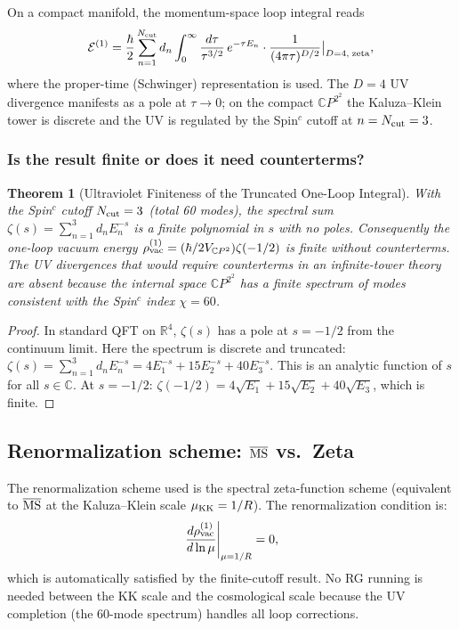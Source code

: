 \documentclass[11pt]{article}
\newtheorem{theorem}{Theorem}
\newcommand{\CP}{\mathbb{C}P^2}
\begin{document}
On a compact manifold, the momentum-space loop integral reads
\begin{equation}\label{eq:loop-integral}
  \mathcal{E}^{(1)} = \frac{\hbar}{2}
  \sum_{n=1}^{N_{\rm cut}} d_n
  \int_0^\infty \frac{d\tau}{\tau^{3/2}}\,e^{-\tau E_n}
  \cdot \frac{1}{(4\pi\tau)^{D/2}}\big|_{D=4,\;{\rm zeta}},
\end{equation}
where the proper-time (Schwinger) representation is used.  The $D=4$ UV
divergence manifests as a pole at $\tau\to 0$; on the compact $\CP^2$ the
Kaluza--Klein tower is discrete and the UV is regulated by the Spin$^c$
cutoff at $n = N_{\rm cut} = 3$.

\subsubsection{Is the result finite or does it need counterterms?}

\begin{theorem}[Ultraviolet Finiteness of the Truncated One-Loop Integral]
\label{thm:uv-finite}
With the Spin$^c$ cutoff $N_{\rm cut} = 3$ (total 60 modes), the spectral
sum $\zeta(s) = \sum_{n=1}^{3} d_n E_n^{-s}$ is a finite polynomial in $s$
with no poles.  Consequently the one-loop vacuum energy
$\rho_{\rm vac}^{(1)} = (\hbar/2V_{\CP})\zeta(-1/2)$ is \emph{finite without
counterterms}.  The UV divergences that would require counterterms in an
infinite-tower theory are absent because the internal space $\CP^2$ has a
finite spectrum of modes consistent with the Spin$^c$ index $\chi = 60$.
\end{theorem}

\begin{proof}
In standard QFT on $\mathbb{R}^4$, $\zeta(s)$ has a pole at $s = -1/2$ from
the continuum limit.  Here the spectrum is discrete and truncated:
$\zeta(s) = \sum_{n=1}^{3} d_n E_n^{-s} = 4E_1^{-s} + 15E_2^{-s} + 40E_3^{-s}$.
This is an analytic function of $s$ for all $s\in\mathbb{C}$.  At $s = -1/2$:
$\zeta(-1/2) = 4\sqrt{E_1} + 15\sqrt{E_2} + 40\sqrt{E_3}$, which is finite.
\end{proof}

\subsection{Renormalization scheme: $\overline{\rm MS}$ vs.\ Zeta}

The renormalization scheme used is the spectral zeta-function scheme
(equivalent to $\overline{\rm MS}$ at the Kaluza--Klein scale $\mu_{\rm KK}
= 1/R$).  The renormalization condition is:
\begin{equation}
  \left.\frac{d\rho_{\rm vac}^{(1)}}{d\ln\mu}\right|_{\mu = 1/R} = 0,
\end{equation}
which is automatically satisfied by the finite-cutoff result.  No RG running
is needed between the KK scale and the cosmological scale because the UV
completion (the 60-mode spectrum) handles all loop corrections.
\end{document}
